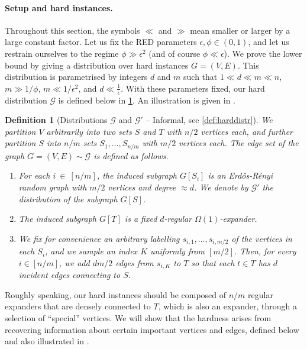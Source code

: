 \documentclass[epsfig,letter,11pt]{article}
\numberwithin{equation}{section}
\newcommand{\eps}{\epsilon}
\newtheorem{definition}[theorem]{Definition}
\begin{document}
\paragraph*{Setup and hard instances.}
Throughout this section, the symbols $\ll$ and $\gg$ mean smaller or larger by a large constant factor. Let us fix the RED parameters $\epsilon, \phi\in (0,1)$, and let us restrain ourselves to the regime $\phi \gg \eps^2$ (and of course $\phi \ll \epsilon$). We prove the lower bound by giving a distribution over hard instances $G=(V, E)$. This distribution is parametrised by integers $d$ and $m$ such that $1 \ll d \ll m \ll n$, $m \gg 1/\phi$, $ m \ll 1/\eps^2$, and $d \ll \frac{1}{\eps}$. With these parameters fixed, our hard distribution $\mathcal{G}$ is defined below in \cref{def:harddistrsimple}. An illustration is given in .



\begin{definition}[Distributions $\mathcal{G}$ and $\mathcal{G}'$ -- Informal, see \cref{def:harddistr}]
	\label{def:harddistrsimple}
 We partition $V$ arbitrarily  into two sets $S$ and $T$ with $n/2$ vertices each, and further partition $S$ into $n/m$ sets $S_1,\dots,S_{n/m}$ with $m/2$ vertices each. The edge set of the graph $G=(V,E) \sim \mathcal{G}$ is defined as follows.

\begin{enumerate}
    \item  For each $i~\in~[n/m]$, the induced subgraph $G[S_i]$ is an Erd\H{o}s-R\'{e}nyi random graph with $m/2$ vertices and degree $\approx d$. We denote by $\mathcal{G}'$ the distribution of the subgraph $G[S]$.

\item The induced subgraph $G[T]$ is a {\em fixed} $d$-regular $ \Omega(1)$-expander.

\item We fix for convenience an arbitrary labelling $s_{i,1},\dots,s_{i,m/2}$ of the vertices in each $S_i$, and we sample an index $K$ uniformly from $[m/2]$. Then, for every $i\in [n/m]$, we add $dm/2$ edges from $s_{i,K}$ to $T$ so that each $t \in T$ has $d$ incident edges connecting to $S$.
\end{enumerate}

\end{definition}
\noindent
Roughly speaking, our hard instances should be composed of $n/m$ regular expanders that are densely connected to $T$, which is also an expander, through a selection of ``special'' vertices. We will show that the hardness arises from recovering information about certain important vertices and edges, defined below and also illustrated in .
\end{document}
